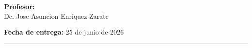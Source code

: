 \documentclass[12pt,a4paper]{article}
\begin{document}
\begin{titlepage}
    \vspace{0.5cm}
    {\large \textbf{Profesor:}}\\
    {\normalsize Dc. Jose Asuncion Enriquez Zarate}

    \vspace{0.5cm}
    {\large \textbf{Fecha de entrega:}} 25 de junio de 2026

    \vfill
    \noindent\rule{\linewidth}{1pt}
\end{titlepage}

\newpage

\tableofcontents
\newpage






\end{document}
